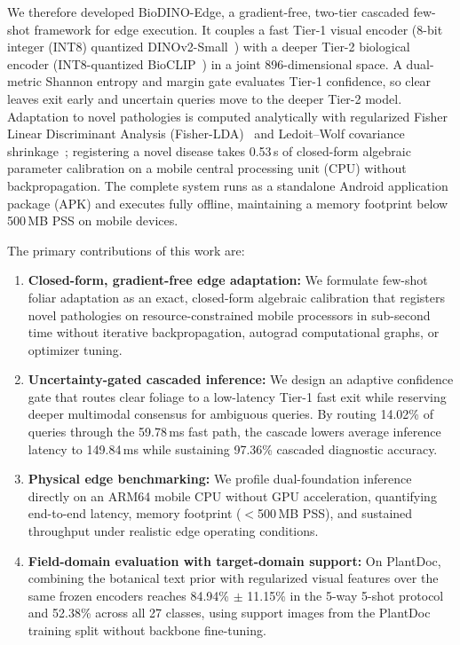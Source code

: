We therefore developed BioDINO-Edge, a gradient-free, two-tier cascaded few-shot framework for edge execution. It couples a fast Tier-1 visual encoder (8-bit integer (INT8) quantized DINOv2-Small~\cite{oquab2023dinov2}) with a deeper Tier-2 biological encoder (INT8-quantized BioCLIP~\cite{stevens2024bioclip}) in a joint 896-dimensional space. A dual-metric Shannon entropy and margin gate evaluates Tier-1 confidence, so clear leaves exit early and uncertain queries move to the deeper Tier-2 model. Adaptation to novel pathologies is computed analytically with regularized Fisher Linear Discriminant Analysis (Fisher-LDA)~\cite{fisher1936use,rao1948utilization} and Ledoit--Wolf covariance shrinkage~\cite{ledoit2004well}; registering a novel disease takes 0.53\,s of closed-form algebraic parameter calibration on a mobile central processing unit (CPU) without backpropagation. The complete system runs as a standalone Android application package (APK) and executes fully offline, maintaining a memory footprint below 500\,MB PSS on mobile devices.

The primary contributions of this work are:
\begin{enumerate}
    \item \textbf{Closed-form, gradient-free edge adaptation:} We formulate few-shot foliar adaptation as an exact, closed-form algebraic calibration that registers novel pathologies on resource-constrained mobile processors in sub-second time without iterative backpropagation, autograd computational graphs, or optimizer tuning.
    \item \textbf{Uncertainty-gated cascaded inference:} We design an adaptive confidence gate that routes clear foliage to a low-latency Tier-1 fast exit while reserving deeper multimodal consensus for ambiguous queries. By routing 14.02\% of queries through the 59.78\,ms fast path, the cascade lowers average inference latency to 149.84\,ms while sustaining 97.36\% cascaded diagnostic accuracy.
    \item \textbf{Physical edge benchmarking:} We profile dual-foundation inference directly on an ARM64 mobile CPU without GPU acceleration, quantifying end-to-end latency, memory footprint ($<$500\,MB PSS), and sustained throughput under realistic edge operating conditions.
    \item \textbf{Field-domain evaluation with target-domain support:} On PlantDoc, combining the botanical text prior with regularized visual features over the same frozen encoders reaches 84.94\% $\pm$ 11.15\% in the 5-way 5-shot protocol and 52.38\% across all 27 classes, using support images from the PlantDoc training split without backbone fine-tuning.
\end{enumerate}

